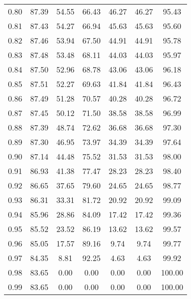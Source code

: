 \begin{tabular}{|c|c|c|c|c|c|c|}
      0.80 &     87.39 &     54.55 &      66.43 &   46.27 &      46.27 &         95.43 \\
      0.81 &     87.43 &     54.27 &      66.94 &   45.63 &      45.63 &         95.60 \\
      0.82 &     87.46 &     53.94 &      67.50 &   44.91 &      44.91 &         95.78 \\
      0.83 &     87.48 &     53.48 &      68.11 &   44.03 &      44.03 &         95.97 \\
      0.84 &     87.50 &     52.96 &      68.78 &   43.06 &      43.06 &         96.18 \\
      0.85 &     87.51 &     52.27 &      69.63 &   41.84 &      41.84 &         96.43 \\
      0.86 &     87.49 &     51.28 &      70.57 &   40.28 &      40.28 &         96.72 \\
      0.87 &     87.45 &     50.12 &      71.50 &   38.58 &      38.58 &         96.99 \\
      0.88 &     87.39 &     48.74 &      72.62 &   36.68 &      36.68 &         97.30 \\
      0.89 &     87.30 &     46.95 &      73.97 &   34.39 &      34.39 &         97.64 \\
      0.90 &     87.14 &     44.48 &      75.52 &   31.53 &      31.53 &         98.00 \\
      0.91 &     86.93 &     41.38 &      77.47 &   28.23 &      28.23 &         98.40 \\
      0.92 &     86.65 &     37.65 &      79.60 &   24.65 &      24.65 &         98.77 \\
      0.93 &     86.31 &     33.31 &      81.72 &   20.92 &      20.92 &         99.09 \\
      0.94 &     85.96 &     28.86 &      84.09 &   17.42 &      17.42 &         99.36 \\
      0.95 &     85.52 &     23.52 &      86.19 &   13.62 &      13.62 &         99.57 \\
      0.96 &     85.05 &     17.57 &      89.16 &    9.74 &       9.74 &         99.77 \\
      0.97 &     84.35 &      8.81 &      92.25 &    4.63 &       4.63 &         99.92 \\
      0.98 &     83.65 &      0.00 &       0.00 &    0.00 &       0.00 &        100.00 \\
      0.99 &     83.65 &      0.00 &       0.00 &    0.00 &       0.00 &        100.00 \\
\bottomrule
\end{tabular}
